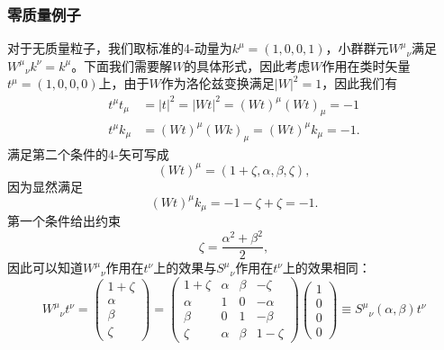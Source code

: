\subsubsection{零质量例子}
对于无质量粒子，我们取标准的4-动量为$ k^{\mu } =( 1,0,0,1)$，小群群元$ W^{\mu }{}_{\nu }$满足$ W^{\mu }{}_{\nu } k^{\nu } =k^{\mu }$。下面我们需要解$ W$的具体形式，因此考虑$ W$作用在类时矢量$ t^{\mu } =( 1,0,0,0)$上，由于$ W$作为洛伦兹变换满足$ | W| ^{2} =1$，因此我们有
\begin{equation*}
	\begin{aligned}
		t^{\mu } t_{\mu } & =| t| ^{2} =| Wt| ^{2} =(Wt )^{\mu }( Wt)_{\mu } =-1\\
		t^{\mu } k_{\mu } & =(Wt )^{\mu }( Wk)_{\mu } =(Wt )^{\mu } k_{\mu } =-1.
	\end{aligned}
\end{equation*}
满足第二个条件的4-矢可写成
\begin{equation*}
	( Wt)^{\mu } =( 1+\zeta ,\alpha ,\beta ,\zeta ) ,
\end{equation*}
因为显然满足
\begin{equation*}
	(Wt )^{\mu } k_{\mu } =-1-\zeta +\zeta =-1.
\end{equation*}
第一个条件给出约束
\begin{equation*}
	\zeta =\frac{\alpha ^{2} +\beta ^{2}}{2} ,
\end{equation*}
因此可以知道$ W^{\mu }{}_{\nu }$作用在$ t^{\nu }$上的效果与$ S^{\mu }{}_{\nu }$作用在$ t^{\nu }$上的效果相同：
\begin{equation*}
	W^{\mu }{}_{\nu } t^{\nu } =\begin{pmatrix}
		1+\zeta \\
		\alpha \\
		\beta \\
		\zeta 
	\end{pmatrix} =\begin{pmatrix}
		1+\zeta  & \alpha  & \beta  & -\zeta \\
		\alpha  & 1 & 0 & -\alpha \\
		\beta  & 0 & 1 & -\beta \\
		\zeta  & \alpha  & \beta  & 1-\zeta 
	\end{pmatrix}\begin{pmatrix}
		1\\
		0\\
		0\\
		0
	\end{pmatrix} \equiv S^{\mu }{}_{\nu }( \alpha ,\beta ) t^{\nu }
\end{equation*}

